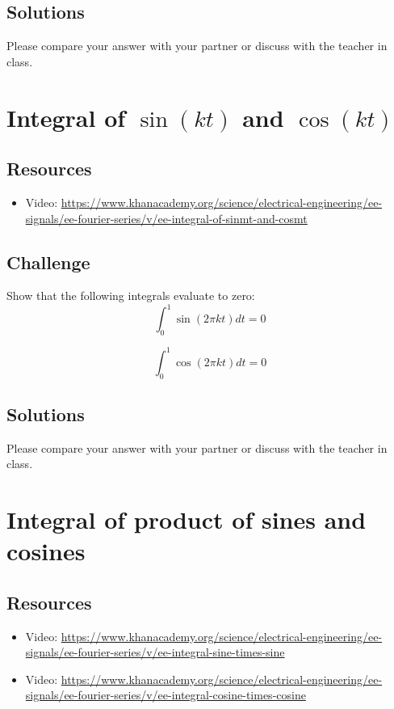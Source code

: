 \subsection*{Solutions}
Please compare your answer with your partner or discuss with the teacher in class.




\newpage

\section{Integral of $\sin(kt)$ and $\cos(kt)$}

\subsection*{Resources}
\begin{itemize}
    \item Video: \url{https://www.khanacademy.org/science/electrical-engineering/ee-signals/ee-fourier-series/v/ee-integral-of-sinmt-and-cosmt}
\end{itemize}

\subsection*{Challenge}
Show that the following integrals evaluate to zero:
\begin{equation}
    \int_0^1 \sin(2 \pi k t) dt = 0
\end{equation}

\begin{equation}
    \int_0^1 \cos(2 \pi k t) dt = 0
\end{equation}

\subsection*{Solutions}
Please compare your answer with your partner or discuss with the teacher in class.




\newpage

\section{Integral of product of sines and cosines}

\subsection*{Resources}
\begin{itemize}
    \item Video: \url{https://www.khanacademy.org/science/electrical-engineering/ee-signals/ee-fourier-series/v/ee-integral-sine-times-sine}
    \item Video: \url{https://www.khanacademy.org/science/electrical-engineering/ee-signals/ee-fourier-series/v/ee-integral-cosine-times-cosine}
\end{itemize}

